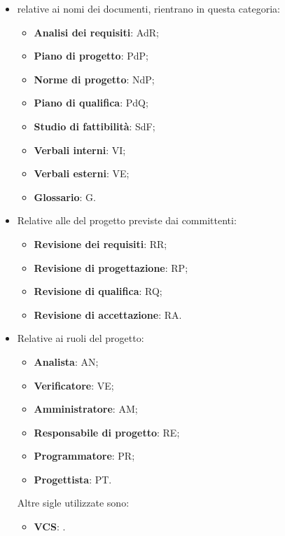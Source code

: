 \begin{itemize}
    \item relative ai nomi dei documenti, rientrano in questa categoria:
    \begin{itemize}
        \item \textbf{Analisi dei requisiti}: AdR;
        \item \textbf{Piano di progetto}: PdP;
        \item \textbf{Norme di progetto}: NdP;
        \item \textbf{Piano di qualifica}: PdQ;
        \item \textbf{Studio di fattibilità}: SdF;
        \item \textbf{Verbali interni}: VI;
        \item \textbf{Verbali esterni}: VE;
        \item \textbf{Glossario}: G.
    \end{itemize}
    \item Relative alle  del progetto previste dai committenti:
    \begin{itemize}
        \item \textbf{Revisione dei requisiti}: RR;
        \item \textbf{Revisione di progettazione}: RP;
        \item \textbf{Revisione di qualifica}: RQ;
        \item \textbf{Revisione di accettazione}: RA.
    \end{itemize}
    \item Relative ai ruoli del progetto:
    \begin{itemize}
        \item \textbf{Analista}: AN;
        \item \textbf{Verificatore}: VE;
        \item \textbf{Amministratore}: AM;
        \item \textbf{Responsabile di progetto}: RE;
        \item \textbf{Programmatore}: PR;
        \item \textbf{Progettista}: PT.
    \end{itemize}
    Altre sigle utilizzate sono:
    \begin{itemize}
        \item \textbf{VCS}: .
    \end{itemize}
\end{itemize}

